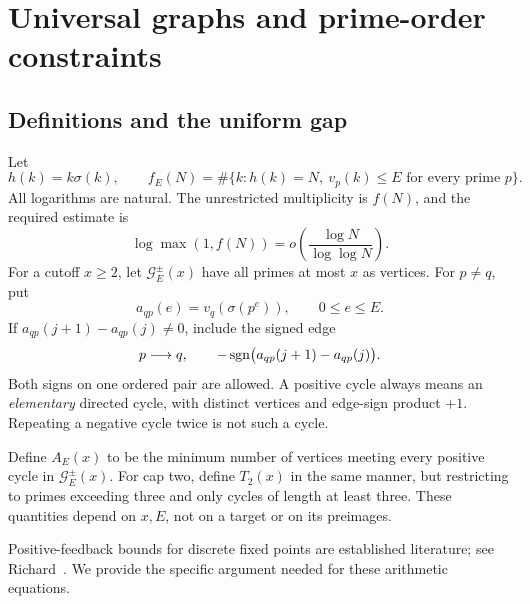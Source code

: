 \chapter{Universal graphs and prime-order constraints}\label{ch:universal}
\section{Definitions and the uniform gap}
Let
\[
 h(k)=k\sigma(k),\qquad f_E(N)=\#\{k:h(k)=N,\ v_p(k)\le E\text{ for every prime }p\}.
\]
All logarithms are natural. The unrestricted multiplicity is $f(N)$, and the required estimate is
\[
 \log\max(1,f(N))=o\!\left(\frac{\log N}{\log\log N}\right).
\]
For a cutoff $x\ge2$, let $\mathcal G_E^{\pm}(x)$ have all primes at most $x$ as vertices. For $p\ne q$, put
\[
 a_{qp}(e)=v_q(\sigma(p^e)),\qquad 0\le e\le E.
\]
If $a_{qp}(j+1)-a_{qp}(j)\ne0$, include the signed edge
\[
 p\longrightarrow q,\qquad -\operatorname{sgn}\bigl(a_{qp}(j+1)-a_{qp}(j)\bigr).
\]
Both signs on one ordered pair are allowed. A positive cycle always means an \emph{elementary} directed cycle, with distinct vertices and edge-sign product $+1$. Repeating a negative cycle twice is not such a cycle.

Define $A_E(x)$ to be the minimum number of vertices meeting every positive cycle in $\mathcal G_E^{\pm}(x)$. For cap two, define $T_2(x)$ in the same manner, but restricting to primes exceeding three and only cycles of length at least three. These quantities depend on $x,E$, not on a target or on its preimages.

Positive-feedback bounds for discrete fixed points are established literature; see Richard~\cite{richard2022}. We provide the specific argument needed for these arithmetic equations.


